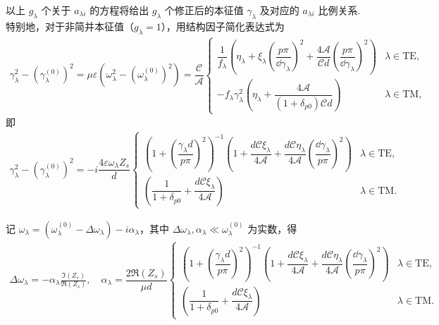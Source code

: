 以上 \(g_{\lambda}\) 个关于 \(a_{\lambda i}\) 的方程将给出 \(g_{\lambda}\) 个修正后的本征值 \(\gamma_{\lambda}\) 及对应的 \(a_{\lambda i}\) 比例关系.特别地，对于非简并本征值（\(g_{\lambda} = 1\)），用结构因子简化表达式为
\begin{align*}
	\gamma_{\lambda}^2 - (\gamma_{\lambda}^{(0)})^2 = \mu\varepsilon \left( \omega_{\lambda}^2 - (\omega_{\lambda}^{(0)})^2 \right) = \dfrac{\mathcal{C}}{\mathcal{A}} \begin{cases}
		\dfrac{1}{f_{\lambda}} \left( \eta_{\lambda} + \xi_{\lambda} \left( \dfrac{p\pi}{\dd \gamma_{\lambda}} \right)^2 + \dfrac{4\mathcal{A}}{\mathcal{C}d} \left( \dfrac{p\pi}{\dd \gamma_{\lambda}} \right)^2 \right) & \lambda \in \text{TE}, \\
		-f_{\lambda} \gamma_{\lambda}^2 \left( \eta_{\lambda} + \dfrac{4\mathcal{A}}{(1+\delta_{p0})\mathcal{C}d} \right)                                                                                               & \lambda \in \text{TM},
	\end{cases}
\end{align*}
即
\begin{align*}
	\gamma_{\lambda}^2 - (\gamma_{\lambda}^{(0)})^2 = -i\dfrac{ 4 \varepsilon \omega_{\lambda} Z_s}{d} \begin{cases}
		\left( 1 + \left( \dfrac{\gamma_{\lambda} d}{p\pi} \right)^2 \right)^{-1} \left( 1 + \dfrac{d \mathcal{C} \xi_{\lambda}}{4\mathcal{A}} + \dfrac{d \mathcal{C} \eta_{\lambda}}{4\mathcal{A}} \left( \dfrac{\dd \gamma_{\lambda}}{p\pi} \right)^2 \right) & \lambda \in \text{TE}, \\[9pt]
		\left( \dfrac{1}{1+\delta_{p0}} + \dfrac{d \mathcal{C} \xi_{\lambda}}{4\mathcal{A}} \right)                                                                                                                                                            & \lambda \in \text{TM}.
	\end{cases}
\end{align*}

记 \(\omega_{\lambda} = (\omega_{\lambda}^{(0)} - \Delta\omega_{\lambda}) - i \alpha_{\lambda}\)，其中 \(\Delta\omega_{\lambda}, \alpha_{\lambda} \ll \omega_{\lambda}^{(0)}\) 为实数，得
\begin{align*}
	\Delta\omega_{\lambda} = -\alpha_{\lambda} \frac{\Im(Z_s)}{\Re(Z_s)}, \quad \alpha_{\lambda} = \dfrac{2 \Re(Z_s)}{\mu d} \begin{cases}
		\left( 1 + \left( \dfrac{\gamma_{\lambda} d}{p\pi} \right)^2 \right)^{-1} \left( 1 + \dfrac{d \mathcal{C} \xi_{\lambda}}{4\mathcal{A}} + \dfrac{d \mathcal{C} \eta_{\lambda}}{4\mathcal{A}} \left( \dfrac{\dd \gamma_{\lambda}}{p\pi} \right)^2 \right) & \lambda \in \text{TE}, \\[8pt]
		\left( \dfrac{1}{1+\delta_{p0}} + \dfrac{d \mathcal{C} \xi_{\lambda}}{4\mathcal{A}} \right)                                                                                                                                                            & \lambda \in \text{TM}.
	\end{cases}
\end{align*}

